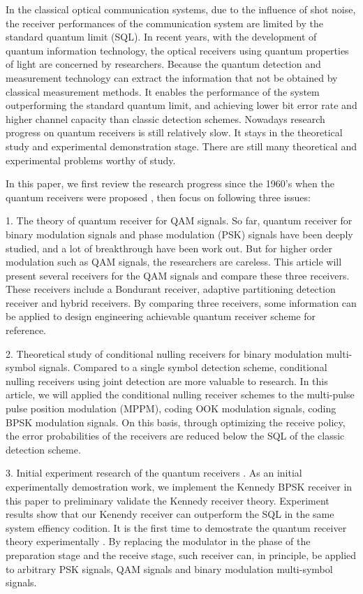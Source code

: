 \begin{enabstract}
In the classical optical communication systems, 
due to the influence of shot noise,
the receiver performances of the communication system  
are limited by the standard quantum limit (SQL).
In recent years, with the development of quantum information technology, 
the optical receivers using quantum properties of light 
are concerned by researchers.
Because the quantum detection and measurement  technology can extract the information 
that not be obtained by classical measurement methods.
It enables the performance of the system outperforming the standard quantum limit,
and achieving lower bit error rate and higher channel capacity than classic detection schemes.
Nowadays research progress on quantum receivers is still relatively slow. 
It stays in the theoretical study and experimental demonstration stage.
There are still many theoretical and experimental problems worthy of study.


In this paper, we first review the research progress since the 1960's when the quantum receivers were proposed ,
then focus on following three issues:


1. The theory of quantum receiver for QAM signals.
So far, quantum receiver for binary modulation signals and phase modulation (PSK) signals 
have been deeply studied, and a lot of breakthrough have been work out.
But for higher order modulation such as QAM signals, the researchers are careless.
This article will present several receivers for the QAM signals and compare these three receivers.
These receivers include a  Bondurant receiver, 
adaptive partitioning detection receiver and hybrid receivers.
By comparing three receivers, some information can be applied to 
design engineering achievable quantum receiver scheme for reference.

2. Theoretical study of conditional nulling receivers for binary modulation multi-symbol signals.
Compared to a single symbol detection scheme, conditional nulling receivers using joint detection  
are more valuable to research. In this article, we will applied the conditional nulling receiver schemes
to the multi-pulse pulse position modulation (MPPM), coding OOK modulation signals,
coding BPSK modulation signals. On this basis, through optimizing the receive policy,
the error probabilities of the receivers are reduced below the SQL of the classic detection scheme.

3. Initial experiment research of  the quantum receivers .
As an initial  experimentally  demostration work, we implement the Kennedy BPSK receiver in this paper 
to preliminary validate the Kennedy receiver theory.
Experiment results show that our Kenendy receiver can outperform the SQL in the same system effiency codition.
It is the first time to demostrate the quantum receiver theory  experimentally .
By replacing the modulator in the phase of the preparation stage and the receive stage,
such receiver can, in principle, be applied to arbitrary PSK signals, QAM signals and binary modulation multi-symbol signals.

\end{enabstract}

